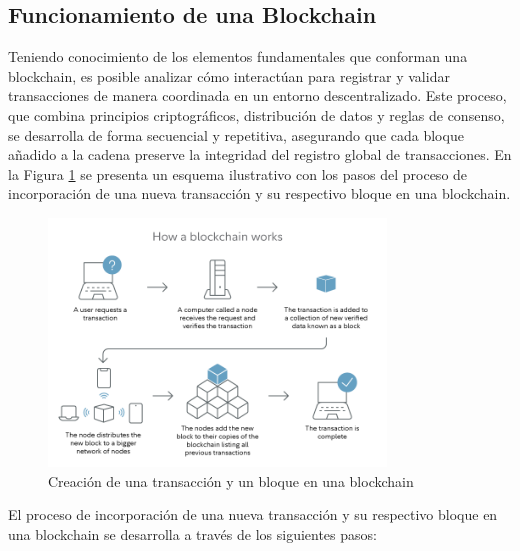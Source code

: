 \subsection{Funcionamiento de una Blockchain}

Teniendo conocimiento de los elementos fundamentales que conforman una blockchain, es posible analizar cómo interactúan para registrar y validar transacciones de manera coordinada en un entorno descentralizado. Este proceso, que combina principios criptográficos, distribución de datos y reglas de consenso, se desarrolla de forma secuencial y repetitiva, asegurando que cada bloque añadido a la cadena preserve la integridad del registro global de transacciones. En la Figura \ref{fig:blockchain-working} se presenta un esquema ilustrativo con los pasos del proceso de incorporación de una nueva transacción y su respectivo bloque en una blockchain. 

\begin{figure}[!tb]
    \centering
    \includegraphics[width=0.8\textwidth]{Figures/block-creation.png}
    \caption{Creación de una transacción y un bloque en una blockchain}
    \label{fig:blockchain-working}
\end{figure}

El proceso de incorporación de una nueva transacción y su respectivo bloque en una blockchain se desarrolla a través de los siguientes pasos:

